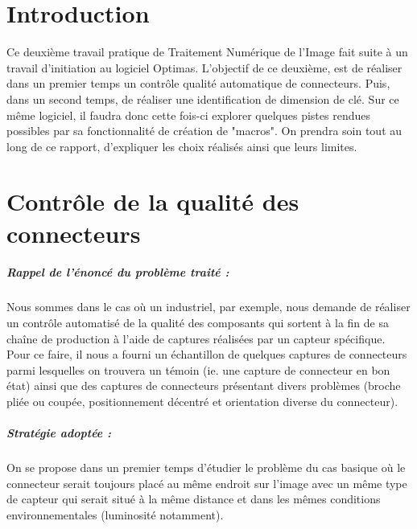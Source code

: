 \documentclass{scrreprt}
\begin{document}
\tableofcontents

\chapter{Introduction}

Ce deuxième travail pratique de Traitement Numérique de l'Image fait suite à un travail d'initiation au logiciel
Optimas. L'objectif de ce deuxième, est de réaliser dans un premier temps un contrôle qualité automatique de connecteurs. Puis,
dans un second temps, de réaliser une identification de dimension de clé. Sur ce même logiciel, il faudra donc cette fois-ci explorer
quelques pistes rendues possibles par sa fonctionnalité de création de "macros". On prendra soin tout au long de ce rapport, d'expliquer
les choix réalisés ainsi que leurs limites.


\chapter{Contrôle de la qualité des connecteurs}

\paragraph{Rappel de l'énoncé du problème traité :}
Nous sommes dans le cas où un industriel, par exemple, nous demande de réaliser un contrôle automatisé de la qualité des 
composants qui sortent à la fin de sa chaîne de production à l'aide de captures réalisées par un capteur spécifique.
Pour ce faire, il nous a fourni un échantillon de quelques captures de connecteurs parmi lesquelles on trouvera 
un témoin (ie. une capture de connecteur en bon état) ainsi que des captures de connecteurs présentant divers 
problèmes (broche pliée ou coupée, positionnement décentré et orientation diverse du connecteur).  

\paragraph{Stratégie adoptée :}
On se propose dans un premier temps d'étudier le problème du cas basique où le connecteur serait toujours placé
au même endroit sur l'image avec un même type de capteur qui serait situé à la même distance et dans les mêmes conditions 
environnementales (luminosité notamment). 
\end{document}
